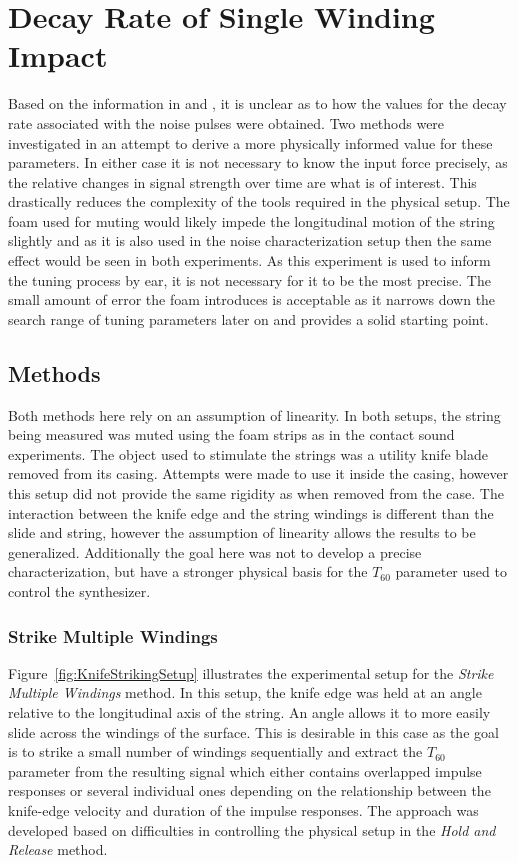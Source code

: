 \documentclass[../main.tex]{subfiles}
\begin{document}
\section{Decay Rate of Single Winding Impact}
\label{sec:DecayRateMeasurement}
Based on the information in  and , it is unclear as to how the values for the decay rate associated with the noise pulses were obtained. Two methods were investigated in an attempt to derive a more physically informed value for these parameters. In either case it is not necessary to know the input force precisely, as the relative changes in signal strength over time are what is of interest. This drastically reduces the complexity of the tools required in the physical setup. The foam used for muting would likely impede the longitudinal motion of the string slightly and as it is also used in the noise characterization setup then the same effect would be seen in both experiments. As this experiment is used to inform the tuning process by ear, it is not necessary for it to be the most precise. The small amount of error the foam introduces is acceptable as it narrows down the search range of tuning parameters later on and provides a solid starting point.

\subsection{Methods}
Both methods here rely on an assumption of linearity. In both setups, the string being measured was muted using the foam strips as in the contact sound experiments. The object used to stimulate the strings was a utility knife blade removed from its casing. Attempts were made to use it inside the casing, however this setup did not provide the same rigidity as when removed from the case. The interaction between the knife edge and the string windings is different than the slide and string, however the assumption of linearity  allows the results to be generalized. Additionally the goal here was not to develop a precise characterization, but have a stronger physical basis for the $T_{60}$ parameter used to control the synthesizer. 

\subsubsection{Strike Multiple Windings}
Figure~\ref{fig:KnifeStrikingSetup} illustrates the experimental setup for the \emph{Strike Multiple Windings} method. In this setup, the knife edge was held at an angle relative to the longitudinal axis of the string. An angle allows it to more easily slide across the windings of the surface. This is desirable in this case as the goal is to strike a small number of windings sequentially and extract the $T_{60}$ parameter from the resulting signal which either contains overlapped impulse responses or several individual ones depending on the relationship between the knife-edge velocity and duration of the impulse responses. The approach was developed based on difficulties in controlling the physical setup in the \emph{Hold and Release} method.
\end{document}
